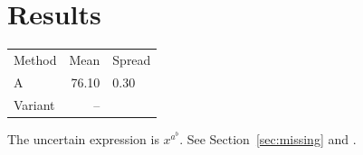 \documentclass{article}
\begin{document}
\section{Results}\label{sec:results}
\begin{tabular}{lr}
Method & Mean & Spread \\
A & 76.10 & 0.30 \\
Variant & -- & \\
\end{tabular}
The uncertain expression is $x^a^b$.
See Section~\ref{sec:missing} and \cite{missing2024}.
\end{document}
